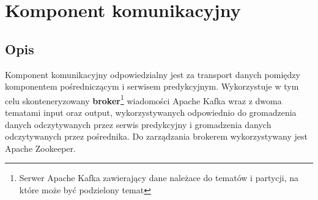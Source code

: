 \documentclass[12pt, a4paper]{report}
\begin{document}
\section{Komponent komunikacyjny}
\subsection{Opis}
Komponent komunikacyjny odpowiedzialny jest za transport danych pomiędzy komponentem pośredniczącym i serwisem predykcyjnym.
Wykorzystuje w tym celu skonteneryzowany \textbf{broker}\footnote{Serwer Apache Kafka zawierający dane należace do tematów i partycji, na które może być podzielony temat}
wiadomości Apache Kafka wraz z dwoma tematami input oraz output, wykorzystywanych
odpowiednio do gromadzenia danych odczytywanych przez serwis predykcyjny i gromadzenia danych odczytywanych przez pośrednika.
Do zarządzania brokerem wykorzystywany jest Apache Zookeeper.
\end{document}
